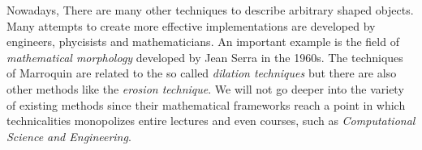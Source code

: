 \vspace{1.5cm}
Nowadays, There are many other techniques to describe arbitrary shaped objects. Many attempts to create more effective implementations are developed by engineers, phycisists and mathematicians. An important example is the field of \emph{mathematical morphology} \citep{serra} developed by Jean Serra in the 1960s. The techniques of Marroquin are related to the so called \emph{dilation techniques} but there are also other methods like the \emph{erosion technique}. We will not go deeper into the variety of existing methods since their mathematical frameworks reach a point in which technicalities monopolizes entire lectures and even courses, such as \emph{Computational Science and Engineering}.












